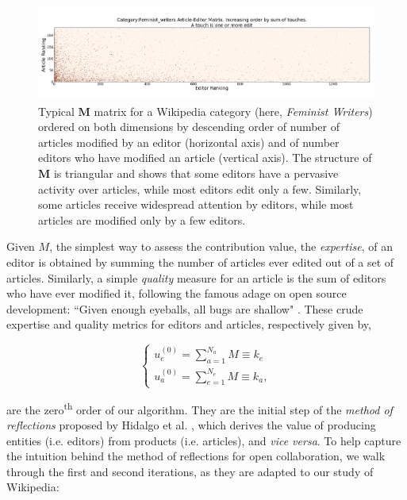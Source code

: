 \begin{figure}[!t]
\centering
\includegraphics[width=2.0\columnwidth]{../Figures/Category_Feminist_writerstriangle_matrix_corrected.png}
\caption{Typical $\mathbf{M}$ matrix for a Wikipedia category (here, {\it Feminist Writers}) ordered on both dimensions by descending order of number of articles modified by an editor (horizontal axis) and of number editors who have modified an article (vertical axis). The structure of $\mathbf{M}$ is triangular and shows that some editors have a pervasive activity over articles, while most editors edit only a few. Similarly, some articles receive widespread attention by editors, while most articles are modified only by a few editors.}
\label{fig:triangle}
\end{figure}


Given $M$, the simplest way to assess the contribution value, the {\it expertise}, of an editor is obtained by summing the number of articles ever edited out of a set of articles. Similarly, a simple {\it quality} measure for an article is the sum of editors who have ever modified it, following the famous adage on open source development: ``Given enough eyeballs, all bugs are shallow" \cite{raymond1999}. These crude expertise and quality metrics for editors and articles, respectively  given by,

\begin{equation}
\begin{cases}
 u_{e}^{(0)} = \sum_{a=1}^{N_{a}} M \equiv k_e\\[7pt]
 u_{a}^{(0)} = \sum_{e=1}^{N_{e}} M \equiv k_a,
\end{cases}
\label{HHinit}
\end{equation}

are the zero\textsuperscript{th} order of our algorithm. They are the initial step of the {\it method of reflections} proposed by Hidalgo et al. \cite{hidalgo2007,hidalgo2009}, which derives the value of producing entities (i.e. editors) from products (i.e. articles), and {\it vice versa}. To help capture the intuition behind the method of reflections for open collaboration, we walk through the first and second iterations, as they are adapted to our study of Wikipedia:

